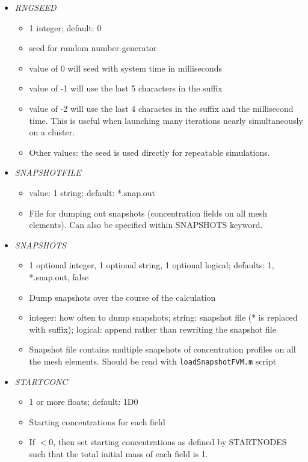 \documentclass[12pt]{article}
\begin{document}
\begin{itemize}
\item {\it RNGSEED}
  \begin{itemize}
    \item 1 integer; default: 0
    \item seed for random number generator
    \item value of 0 will seed with system time in milliseconds
    \item value of -1 will use the last 5 characters in the suffix
    \item value of -2 will use the last 4 charactes in the suffix and the millisecond time. This is useful when launching many iterations nearly simultaneously on a cluster.
    \item Other values: the seed is used directly for repeatable simulations. 
  \end{itemize}
%
\item {\it SNAPSHOTFILE}
    \begin{itemize}
      \item  value: 1 string; default: *.snap.out
      \item File for dumping out snapshots (concentration fields on all mesh elements). Can also be specified within SNAPSHOTS keyword.
    \end{itemize}
%
\item {\it SNAPSHOTS}
\begin{itemize}
	\item 1 optional integer, 1 optional string, 1 optional logical; defaults: 1, *.snap.out, false
	\item Dump snapshots over the course of the calculation
	\item integer: how often to dump snapshots; string: snapshot file (* is replaced with suffix); logical: append rather than rewriting the snapshot file
	\item Snapshot file contains multiple snapshots of concentration profiles on all the mesh elements. Should be read with \verb=loadSnapshotFVM.m= script
\end{itemize}
%
\item {\it STARTCONC}
\begin{itemize}
	\item 1 or more floats; default: 1D0
	\item Starting concentrations for each field 
	\item If $<0$, then set starting concentrations as defined by STARTNODES such that the total initial mass of each field is 1.
\end{itemize}

\end{itemize}
\end{document}
